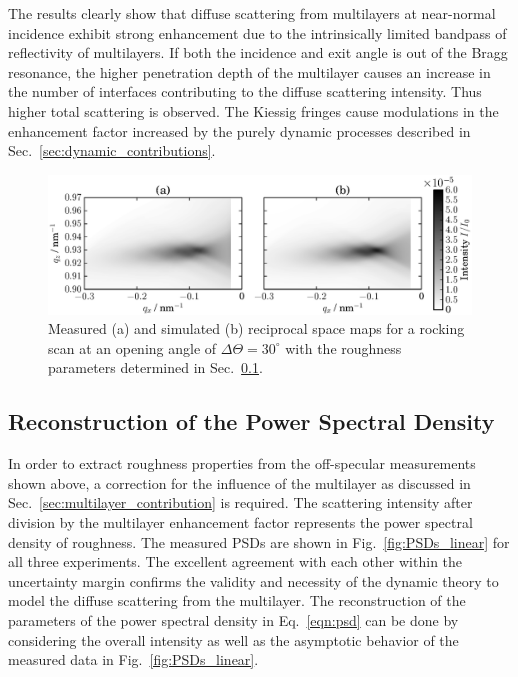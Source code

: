 The results clearly show that diffuse scattering from multilayers at near-normal incidence exhibit strong enhancement due to the intrinsically limited bandpass of reflectivity of multilayers. If both the incidence and exit angle is out of the Bragg resonance, the higher penetration depth of the multilayer causes an increase in the number of interfaces contributing to the diffuse scattering intensity. Thus higher total scattering is observed. The Kiessig fringes cause modulations in the enhancement factor increased by the purely dynamic processes described in Sec.~\ref{sec:dynamic_contributions}.

\begin{figure}
        \includegraphics[width=
        \textwidth]{img/im_mo_si/simulation_vs_measurement} \caption{Measured (a) and simulated (b) reciprocal space maps for a rocking scan at an opening angle of $\Delta\Theta=30^\circ$ with the roughness parameters determined in Sec.~\ref{sec:determination_of_the_psd}.} \label{fig:comparisonWithTheory} 
\end{figure}

\subsection{Reconstruction of the Power Spectral Density} \label{sec:determination_of_the_psd} In order to extract roughness properties from the off-specular measurements shown above, a correction for the influence of the multilayer as discussed in Sec.~\ref{sec:multilayer_contribution} is required. The scattering intensity after division by the multilayer enhancement factor represents the power spectral density of roughness. The measured PSDs are shown in Fig.~\ref{fig:PSDs_linear} for all three experiments. The excellent agreement with each other within the uncertainty margin confirms the validity and necessity of the dynamic theory to model the diffuse scattering from the multilayer. The reconstruction of the parameters of the power spectral density in Eq.~\eqref{eqn:psd} can be done by considering the overall intensity as well as the asymptotic behavior \cite{PhysRevB.54.5860} of the measured data in Fig.~\ref{fig:PSDs_linear}.

